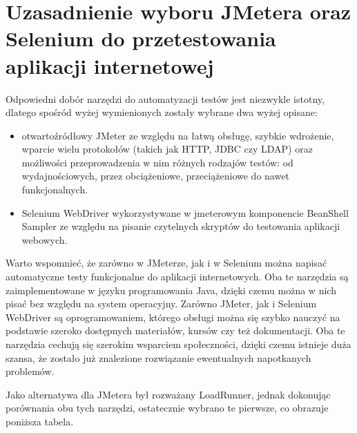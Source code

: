\section{Uzasadnienie wyboru JMetera oraz Selenium do przetestowania aplikacji internetowej}
Odpowiedni dobór narzędzi do automatyzacji testów jest niezwykle istotny, dlatego spośród wyżej wymienionych zostały wybrane dwa wyżej opisane: 
\begin{itemize}
    \item otwartoźródłowy JMeter ze względu na łatwą obsługę, szybkie wdrożenie, wparcie wielu protokołów (takich jak HTTP, JDBC czy LDAP) oraz możliwości przeprowadzenia w nim różnych rodzajów testów: od wydajnościowych, przez obciążeniowe, przeciążeniowe do nawet funkcjonalnych.
    \item Selenium WebDriver wykorzystywane w jmeterowym komponencie BeanShell Sampler ze względu na pisanie czytelnych skryptów do testowania aplikacji webowych.
\end{itemize}

Warto wspomnieć, że zarówno w JMeterze, jak i w Selenium można napisać automatyczne testy funkcjonalne do aplikacji internetowych. Oba te narzędzia są zaimplementowane w języku programowania Java, dzięki czemu można w nich pisać bez względu na system operacyjny. Zarówno JMeter, jak i Selenium WebDriver są oprogramowaniem, którego obsługi można się szybko nauczyć na podstawie szeroko dostępnych materiałów, kursów czy też dokumentacji. Oba te narzędzia cechują się szerokim wsparciem społeczności, dzięki czemu istnieje duża szansa, że zostało już znalezione rozwiązanie ewentualnych napotkanych problemów.

Jako alternatywa dla JMetera był rozważany LoadRunner, jednak dokonując porównania obu tych narzędzi, ostatecznie wybrano te pierwsze, co obrazuje poniższa tabela. 

